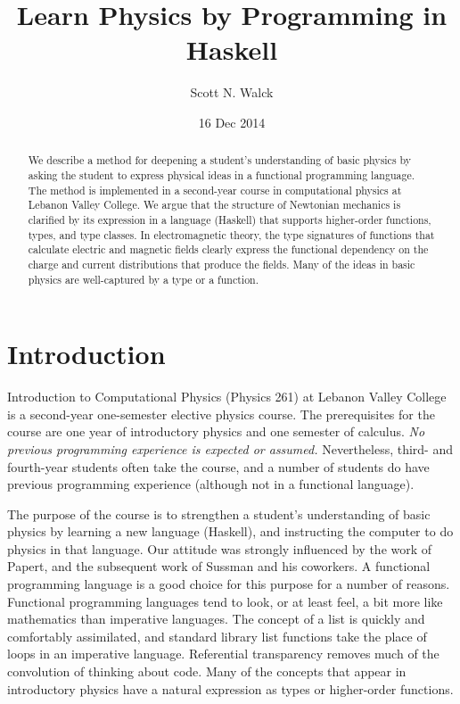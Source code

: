 \documentclass[11pt]{article}
\title{Learn Physics by Programming in Haskell}
\author{Scott N. Walck
}
\date{16 Dec 2014}
\begin{document}
\maketitle

\begin{abstract}

We describe a method for deepening a student's understanding
of basic physics by asking the student to express physical ideas
in a functional programming language.
The method is implemented in a second-year course in computational
physics at Lebanon Valley College.
We argue that the structure of Newtonian mechanics is clarified by its expression in
a language (Haskell) that supports higher-order functions, types, and
type classes.
In electromagnetic theory, the type signatures of functions that calculate
electric and magnetic fields clearly express the functional dependency
on the charge and current distributions that produce the fields.
Many of the ideas in basic physics are well-captured by a type
or a function.

\end{abstract}

\section{Introduction}

Introduction to Computational Physics (Physics 261) at Lebanon Valley College
is a second-year one-semester elective physics course.  The prerequisites for the course
are one year of introductory physics and one semester of calculus.
\emph{No previous programming experience is expected or assumed.}
Nevertheless, third- and fourth-year students often take the course, and
a number of students do have previous programming experience (although
not in a functional language).

The purpose of the course is to strengthen a student's understanding of basic
physics by learning a new language (Haskell), and instructing the computer
to do physics in that language.
Our attitude was strongly influenced by the work of Papert\cite{papert},
and the subsequent work of Sussman and his coworkers\cite{sicm,sussmanFDG}.
A functional programming language is a good choice for this purpose for a number
of reasons.  Functional programming languages tend to look, or at least feel,
a bit more like mathematics than imperative languages.  The concept
of a list is quickly and comfortably assimilated, and standard library list
functions take the place of loops in an imperative language.
Referential transparency removes much of the convolution
of thinking
about code.  Many of the concepts that appear in introductory physics
have a natural expression as types or higher-order functions.
\end{document}
